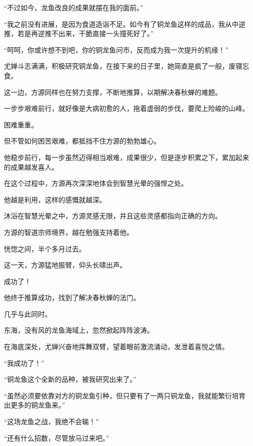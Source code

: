 \begin{this_body}
“不过如今，龙鱼改良的成果就摆在我的面前。”

“我之前没有进展，是因为食道造诣不足。如今有了铜龙鱼这样的成品，我从中逆推，若是再逆推不出来，干脆直接一头撞死好了。”

“呵呵，你或许想不到吧，你的铜龙鱼问市，反而成为我一次提升的机缘！”

尤婵斗志满满，积极研究铜龙鱼，在接下来的日子里，她简直是疯了一般，废寝忘食。

这一边，方源同样也在努力支撑，不断地推算，以期解决春秋蝉的难题。

一步步艰难前行，就好像是大病初愈的人，拖着虚弱的步伐，要爬上险峻的山峰。

困难重重。

但不管如何困苦艰难，都抵挡不住方源的勃勃雄心。

他稳步前行，每一步虽然迈得相当艰难，成果很少，但是逐步积累之下，累加起来的成果越发喜人。

在这个过程中，方源再次深深地体会到智慧光晕的强悍之处。

他越是利用，这样的感慨就越深。

沐浴在智慧光晕之中，方源灵感无限，并且这些灵感都指向正确的方向。

方源的智道宗师境界，越在勉强支持着他。

恍惚之间，半个多月过去。

这一天，方源猛地振臂，仰头长啸出声。

成功了！

他终于推算成功，找到了解决春秋蝉的法门。

几乎与此同时。

东海，没有风的龙鱼海域上，忽然掀起阵阵波涛。

在海底深处，尤婵兴奋地挥舞双臂，望着眼前激流涌动，发泄着喜悦之情。

“我成功了！”

“铜龙鱼这个全新的品种，被我研究出来了。”

“虽然必须要依靠对方的铜龙鱼引种，但只要有了一两只铜龙鱼，我就能繁衍培育出更多的铜龙鱼来。”

“这场龙鱼之战，我绝不会输！”

“还有什么招数，尽管放马过来吧。”

\end{this_body}


